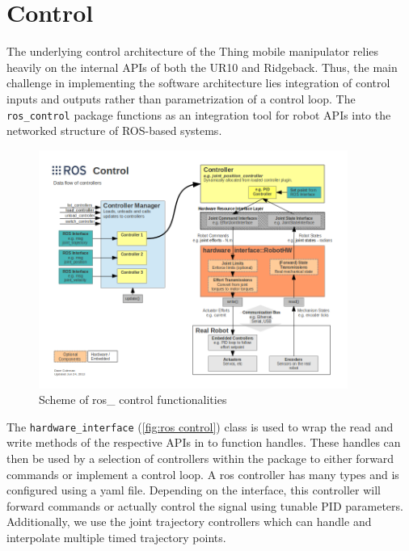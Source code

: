 \documentclass[times, utf8, diplomski, english]{fer}
\begin{document}
\section{Control}\label{section:control}
The underlying control architecture of the Thing mobile manipulator relies heavily on the internal APIs of both the UR10 and Ridgeback.
Thus, the main challenge in implementing the software architecture lies integration of control inputs and outputs rather than parametrization of a control loop.
The \verb|ros_control| package functions as an integration tool for robot APIs into the networked structure of ROS-based systems.
\begin{figure}
\centering
\includegraphics[width=0.9\textwidth]{ros_control}
\caption{Scheme of ros\_ control functionalities}
\label{fig:ros control}
\end{figure}
The \verb|hardware_interface| (\autoref{fig:ros control}) class is used to wrap the read and write methods of the respective APIs in to function handles. 
These handles can then be used by a selection of controllers within the package to either forward commands or implement a control loop.
A ros controller has many types and is configured using a yaml file. 
Depending on the interface, this controller will forward commands or actually control the signal using tunable PID parameters.
Additionally, we use the joint trajectory controllers which can handle and interpolate multiple timed trajectory points.
\end{document}
